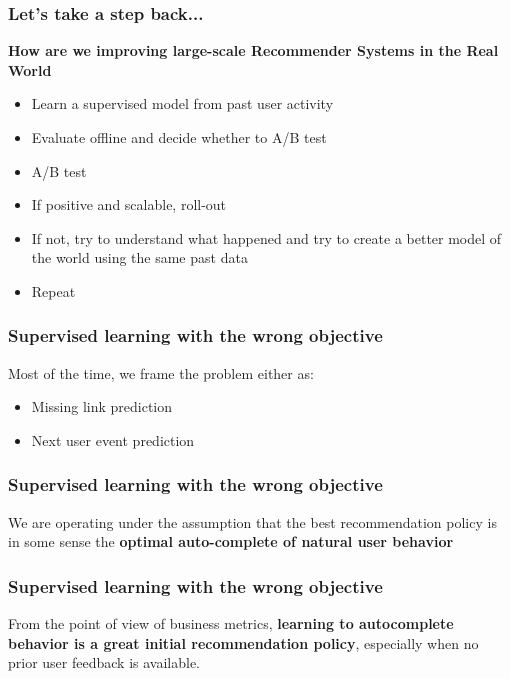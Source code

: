 \begin{frame}
  \frametitle{Let's take a step back...}
  
  \textbf{How are we improving large-scale Recommender Systems in the Real World}
  
  \begin{itemize}
  \item Learn a supervised model from past user activity
  \item Evaluate offline and decide whether to A/B test
  \item A/B test
  \item If positive and scalable, roll-out
  \item If not, try to understand what happened and try to create a better model of the world using the same past data
  \item Repeat
  \end{itemize}
        
  \end{frame}
  



  
  
  
  \begin{frame}
    \frametitle{Supervised learning with the wrong objective}
  
  Most of the time, we frame the problem either as:
  \begin{itemize}
  \item Missing link prediction
  \item Next user event prediction
  \end{itemize}
  
  \end{frame}
  
  
  \begin{frame}
    \frametitle{Supervised learning with the wrong objective}
  
  We are operating under the assumption that the best recommendation policy is in some sense the \textbf{optimal auto-complete of natural user behavior}
  
  \end{frame}
  
  
  \begin{frame}
    \frametitle{Supervised learning with the wrong objective}
  
  From the point of view of business metrics, \textbf{learning to autocomplete behavior is a great initial recommendation policy}, especially when no prior user feedback is available. 
  
  \end{frame}
  
